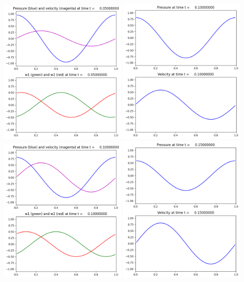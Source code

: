 \documentclass[11pt]{article}
\begin{document}
\includegraphics[width=0.475\textwidth]{frame0001fig2.png}
\vskip 10pt 
\includegraphics[width=0.475\textwidth]{frame0002fig1.png}
\includegraphics[width=0.475\textwidth]{frame0002fig2.png}
\vskip 10pt 
\includegraphics[width=0.475\textwidth]{frame0003fig1.png}
\end{document}
